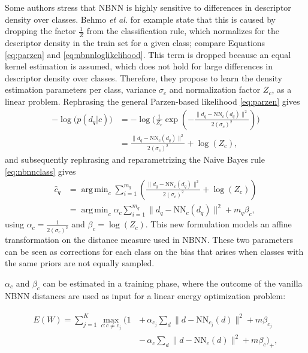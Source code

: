 \documentclass[a4paper,10pt]{article}
\DeclareMathOperator*{\argmin}{arg\,min}
\begin{document}
Some authors \cite{behmo2010towards,wang2011improved} stress that NBNN is highly sensitive to differences in descriptor density over classes. Behmo \emph{et al.} for example state that this is caused by dropping the factor $\frac{1}{Z}$ from the classification rule, which normalizes for the descriptor density in the train set for a given class; compare Equations \eqref{eq:parzen} and \eqref{eq:nbnnloglikelihood}. This term is dropped because an equal kernel estimation is assumed, which does not hold for large differences in descriptor density over classes.\cite{behmo2010towards} Therefore, they propose to learn the density estimation parameters per class, variance $\sigma_c$ and normalization factor $Z_c$, as a linear problem. Rephrasing the general Parzen-based likelihood \eqref{eq:parzen} gives
\begin{align}
    - \log\big(p(d_q|c)\big) &= -\log\Bigg(\frac{1}{ Z_c}\exp\left( -\frac{ \|d_q - \text{NN}_c(d_q)\|^2}{2(\sigma_c)^2}\right)\!\Bigg) \\
    &= \frac{ \|d_q - \text{NN}_c(d_q)\|^2}{2(\sigma_c)^2} + \log(Z_c),
\end{align}
and subsequently rephrasing and reparametrizing the Naive Bayes rule \eqref{eq:nbnnclass} gives
\begin{align}
    \hat c_q &= \argmin_c \sum_{i=1}^{m_q} \left(\frac{ \|d_q - \text{NN}_c(d_q)\|^2}{2(\sigma_c)^2} + \log(Z_c)\right)\\
    &= \argmin_c \alpha_c \sum_{i=1}^{m_q} \|d_q - \text{NN}_c(d_q)\|^2 + m_q\beta_c,
\end{align}
using $\alpha_c = \frac{1}{2(\sigma_c)^2}$ and $\beta_c = \log(Z_c)$. This new formulation models an affine transformation on the distance measure used in NBNN. These two parameters can be seen as corrections for each class on the bias that arises when classes with the same priors are not equally sampled.

$\alpha_c$ and $\beta_c$ can be estimated in a training phase, where the outcome of the vanilla NBNN distances are used as input for a linear energy optimization problem:

\begin{align}\begin{split} \label{eq:energy}
    E(W) = \sum_{j=1}^{K} \max_{c:c\neq c_j} \Big(1\,&+\,\alpha_{c_j} \sum_d \|d - \text{NN}_{c_j}(d)\|^2 + m\beta_{c_j}\\
    &-\,\alpha_{c} \sum_d \|d - \text{NN}_{c}(d)\|^2 + m\beta_{c}\Big)_{+},
\end{split}\end{align}
\end{document}
